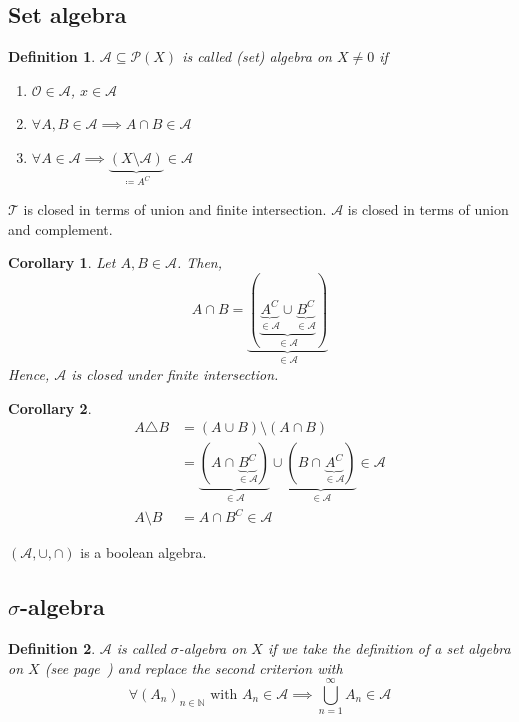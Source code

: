 \documentclass{article}
\newtheorem{definition}{Definition}  \numberwithin{definition}{section}
\newtheorem*{corollary}{Corollary}%
\begin{document}
\subsection{Set algebra}

\begin{definition}\label{def:setalgebra}
  $\mathcal A \subseteq \mathcal P(X)$ is called \emph{(set) algebra on $X \neq 0$} if
  \begin{enumerate}
    \item $\mathcal O \in \mathcal A$, $x \in \mathcal A$
    \item $\forall A,B \in \mathcal A \implies A \cap B \in \mathcal A$
    \item $\forall A \in \mathcal A \implies \underbrace{(X \setminus \mathcal A)}_{\coloneqq A^C} \in \mathcal A$
  \end{enumerate}
\end{definition}
$\mathcal T$ is closed in terms of union and finite intersection.
$\mathcal A$ is closed in terms of union and complement.

\begin{corollary}
  Let $A,B \in \mathcal A$. Then,
  \[ A \cap B = \underbrace{(\underbrace{\underbrace{A^C}_{\in \mathcal A} \cup \underbrace{B^C}_{\in \mathcal A}}_{\in \mathcal A})}_{\in \mathcal A} \]
  Hence, $\mathcal A$ is closed under finite intersection.
\end{corollary}
\begin{corollary}
  \begin{align*}
    A \triangle B
      &= (A \cup B) \setminus (A \cap B) \\
      &= \underbrace{(A \cap \underbrace{B^C}_{\in \mathcal A})}_{\in \mathcal A} \cup \underbrace{(B \cap \underbrace{A^C}_{\in \mathcal A})}_{\in \mathcal A} \in \mathcal A \\
    A \setminus B &= A \cap B^C \in \mathcal A
  \end{align*}
\end{corollary}

$(\mathcal A, \cup, \cap)$ is a boolean algebra.

\subsection[Sigma-algebra]{$\sigma$-algebra}

\begin{definition}
  $\mathcal A$ is called \emph{$\sigma$-algebra on $X$} if we take the definition of a set algebra on $X$ (see page~\pageref{def:setalgebra})
  and replace the second criterion with
  \[ \forall (A_n)_{n \in \mathbb N} \text{ with } A_n \in \mathcal A \implies \bigcup_{n=1}^\infty A_n \in \mathcal A \]
\end{definition}
\end{document}

